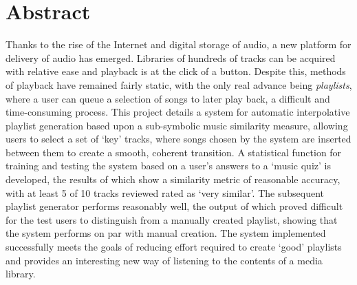 \section*{Abstract}
Thanks to the rise of the Internet and digital storage of audio, a new platform for delivery of audio has emerged. Libraries of hundreds of tracks can be acquired with relative ease and playback is at the click of a button. 
Despite this, methods of playback have remained fairly static, with the only real advance being \emph{playlists}, where a user can queue a selection of songs to later play back, a difficult and time-consuming process.
This project details a system for automatic interpolative playlist generation based upon a sub-symbolic music similarity measure, allowing users to select a set of `key' tracks, where songs chosen by the system are inserted between them to create a smooth, coherent transition.
A statistical function for training and testing the system based on a user's answers to a `music quiz' is developed, the results of which show a similarity metric of reasonable accuracy, with at least 5 of 10 tracks reviewed rated as `very similar'. The subsequent playlist generator performs reasonably well, the output of which proved difficult for the test users to distinguish from a manually created playlist, showing that the system performs on par with manual creation.
The system implemented successfully meets the goals of reducing effort required to create `good' playlists and provides an interesting new way of listening to the contents of a media library.

\vspace{8cm}
